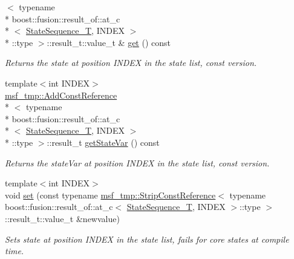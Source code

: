 \begin{DoxyCompactItemize}
$<$ typename \\*
boost\-::fusion\-::result\-\_\-of\-::at\-\_\-c\\*
$<$ \hyperlink{structmsf__core_1_1GenericState__T_a75fe70f7c7517dbf7d4c91b75b08a1dd}{State\-Sequence\-\_\-\-T}, I\-N\-D\-E\-X $>$\\*
\-::type $>$\-::result\-\_\-t\-::value\-\_\-t \& \hyperlink{structmsf__core_1_1GenericState__T_a7c634b0071239e42781a3603b00c9749}{get} () const 
\begin{DoxyCompactList}\small\item\em Returns the state at position I\-N\-D\-E\-X in the state list, const version. \end{DoxyCompactList}\item 
{\footnotesize template$<$int I\-N\-D\-E\-X$>$ }\\\hyperlink{structmsf__tmp_1_1AddConstReference}{msf\-\_\-tmp\-::\-Add\-Const\-Reference}\\*
$<$ typename \\*
boost\-::fusion\-::result\-\_\-of\-::at\-\_\-c\\*
$<$ \hyperlink{structmsf__core_1_1GenericState__T_a75fe70f7c7517dbf7d4c91b75b08a1dd}{State\-Sequence\-\_\-\-T}, I\-N\-D\-E\-X $>$\\*
\-::type $>$\-::result\-\_\-t \hyperlink{structmsf__core_1_1GenericState__T_a932947fcec47edfe556d37087cc74c5b}{get\-State\-Var} () const 
\begin{DoxyCompactList}\small\item\em Returns the state\-Var at position I\-N\-D\-E\-X in the state list, const version. \end{DoxyCompactList}\item 
{\footnotesize template$<$int I\-N\-D\-E\-X$>$ }\\void \hyperlink{structmsf__core_1_1GenericState__T_ac5dc9e9190db9f0faf77e6bc373484ff}{set} (const typename \hyperlink{structmsf__tmp_1_1StripConstReference}{msf\-\_\-tmp\-::\-Strip\-Const\-Reference}$<$ typename boost\-::fusion\-::result\-\_\-of\-::at\-\_\-c$<$ \hyperlink{structmsf__core_1_1GenericState__T_a75fe70f7c7517dbf7d4c91b75b08a1dd}{State\-Sequence\-\_\-\-T}, I\-N\-D\-E\-X $>$\-::type $>$\-::result\-\_\-t\-::value\-\_\-t \&newvalue)
\begin{DoxyCompactList}\small\item\em Sets state at position I\-N\-D\-E\-X in the state list, fails for core states at compile time. \end{DoxyCompactList}\item 

\end{DoxyCompactItemize}
